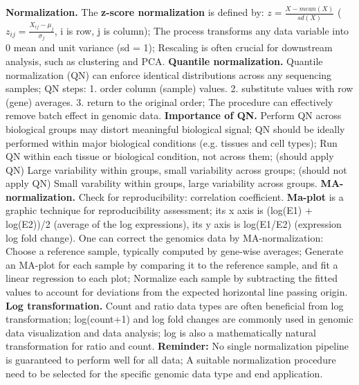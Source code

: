 \vspace{0.1em}\noindent
\textbf{Normalization.} The \textbf{z-score normalization} is defined by: $z=\frac{X-mean(X)}{sd(X)}$ ($z_{ij}=\frac{X_{ij}-\mu_j}{\sigma_j}$, i is row, j is column); The process transforms any data variable into 0 mean and unit variance (sd = 1); Rescaling is often crucial for downstream analysis, such as clustering and PCA. \textbf{Quantile normalization.} Quantile normalization (QN) can enforce identical distributions across any sequencing samples; QN steps: 1. order column (sample) values. 2. substitute values with row (gene) averages. 3. return to the original order; The procedure can effectively remove batch effect in genomic data. \textbf{Importance of QN.} Perform QN across biological groups may distort meaningful biological signal; QN should be ideally performed within major biological conditions (e.g. tissues and cell types); Run QN within each tissue or biological condition, not across them; (should apply QN) Large variability within groups, small variability across groups; (should not apply QN) Small varability within groups, large variability across groups. \textbf{MA-normalization.} Check for reproducibility: correlation coefficient. \textbf{Ma-plot} is a graphic technique for reproducibility assessment; its x axis is (log(E1) + log(E2))/2 (average of the log expressions), its y axis is log(E1/E2) (expression log fold change). One can correct the genomics data by MA-normalization: Choose a reference sample, typically computed by gene-wise averages; Generate an MA-plot for each sample by comparing it to the reference sample, and fit a linear regression to each plot; Normalize each sample by subtracting the fitted values to account for deviations from the expected horizontal line passing origin. \textbf{Log transformation.} Count and ratio data types are often beneficial from log transformation; log(count+1) and log fold changes are commonly used in genomic data visualization and data analysis; log is also a mathematically natural transformation for ratio and count. \textbf{Reminder:} No single normalization pipeline is guaranteed to perform well for all data; A suitable normalization procedure need to be selected for the specific genomic data type and end application.

